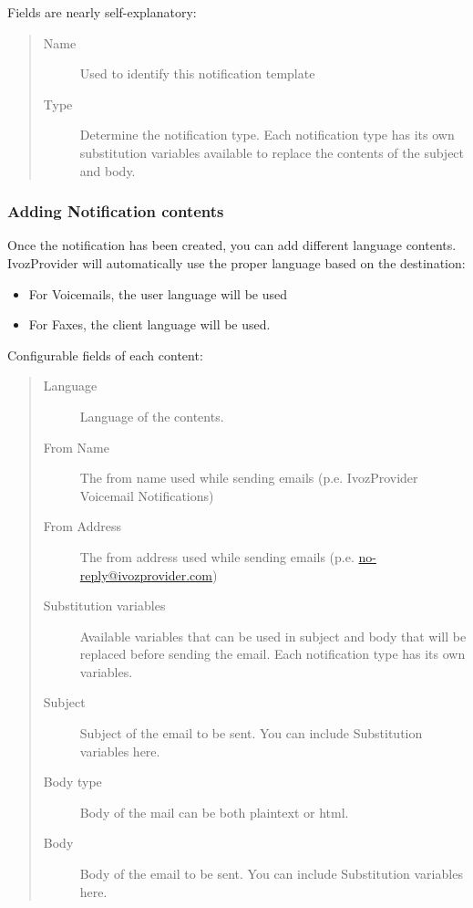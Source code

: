 \documentclass[letterpaper,10pt,english]{sphinxmanual}
\begin{document}
Fields are nearly self-explanatory:
\begin{quote}
\begin{description}
\item[{Name}] \leavevmode
Used to identify this notification template

\item[{Type}] \leavevmode
Determine the notification type. Each notification type has its own substitution variables available to replace
the contents of the subject and body.

\end{description}
\end{quote}


\subsubsection{Adding Notification contents}
\label{administration_portal/brand/settings/notification_templates:adding-notification-contents}
Once the notification has been created, you can add different language contents. IvozProvider will automatically use
the proper language based on the destination:
\begin{itemize}
\item {} 
For Voicemails, the user language will be used

\item {} 
For Faxes, the client language will be used.

\end{itemize}

Configurable fields of each content:
\begin{quote}
\begin{description}
\item[{Language}] \leavevmode
Language of the contents.

\item[{From Name}] \leavevmode
The from name used while sending emails (p.e. IvozProvider Voicemail Notifications)

\item[{From Address}] \leavevmode
The from address used while sending emails (p.e. \href{mailto:no-reply@ivozprovider.com}{no-reply@ivozprovider.com})

\item[{Substitution variables}] \leavevmode
Available variables that can be used in subject and body that will be replaced before sending the email. Each
notification type has its own variables.

\item[{Subject}] \leavevmode
Subject of the email to be sent. You can include Substitution variables here.

\item[{Body type}] \leavevmode
Body of the mail can be both plaintext or html.

\item[{Body}] \leavevmode
Body of the email to be sent. You can include Substitution variables here.

\end{description}
\end{quote}
\end{document}
